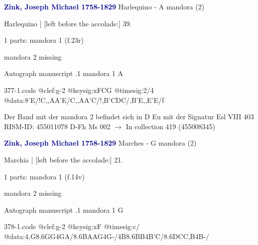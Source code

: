 \documentclass[twocolumn]{book}
\begin{document}
\newline \par \vspace{7pt} \textcolor{darkblue}{\textbf{Zink, Joseph Michael  1758-1829}}
\newline Harlequino - A
\newline mandora (2)
\newline \begin{itshape}[f.23r, at left:] Harlequino | [left before the accolade:] 39.\end{itshape} 
\newline \textcolor{darkblue}{}  1 parts: mandora 1  (f.23r)
\newline \begin{small} mandora 2 missing\end{small} 
\newline Autograph manuscript
.1  mandora 1  A  
\begin{filecontents*}{377-1.code}
@clef:g-2
@keysig:xFCG
@timesig:2/4
@data:8'E/!C,,AA'E/C,,AA'C/!{,B'C}{DC}/,B'E,,E'E/f
\end{filecontents*}
\newline
%

\newline Der Band mit der mandora 2 befindet sich in D Eu mit der Signatur Esl VIII 403
\newline RISM-ID: 455011078
\newline D-Fh  Ms 002
\newline $\rightarrow$ In collection 419 (455008345)
      
\newline \par \vspace{7pt} \textcolor{darkblue}{\textbf{Zink, Joseph Michael  1758-1829}}
\newline Marches - G
\newline mandora (2)
\newline \begin{itshape}[f.14v, at left:] Marchia | [left before the accolade:] 21.\end{itshape} 
\newline \textcolor{darkblue}{}  1 parts: mandora 1  (f.14v)
\newline \begin{small} mandora 2 missing\end{small} 
\newline Autograph manuscript
.1  mandora 1  G  
\begin{filecontents*}{378-1.code}
@clef:g-2
@keysig:xF
@timesig:c/
@data:4,G{8.6GG}4GA/{8.6BA}{AG}4G-/4B{8.6BB}4B'C/{8.6DC}{C,B}4B-/
\end{filecontents*}
\newline
%
\end{document}
